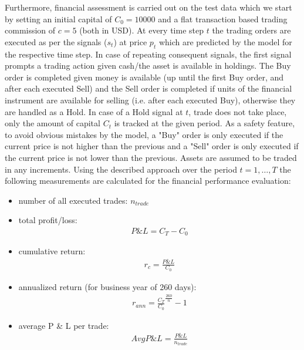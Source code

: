 \documentclass[12pt, a4paper]{article}
\begin{document}
Furthermore, financial assessment is carried out on the test data which we start by setting an initial capital of $C_0 = 10000$ and a flat transaction based trading commission of $c = 5$ (both in USD). At every time step $t$ the trading orders are executed as per the signals ($s_t$) at price $p_t$ which are predicted by the model for the respective time step.
In case of repeating consequent signals, the first signal prompts a trading action given cash/the asset is available in holdings. The Buy order is completed given money is available (up until the first Buy order, and after each executed Sell) and the Sell order is completed if units of the financial instrument are available for selling (i.e. after each executed Buy), otherwise they are handled as a Hold. In case of a Hold signal at $t$, trade does not take place, only the amount of capital $C_t$ is tracked at the given period. As a safety feature, to avoid obvious mistakes by the model, a "Buy" order is only executed if the current price is not higher than the previous and a "Sell" order is only executed if the current price is not lower than the previous.
Assets are assumed to be traded in any increments. Using the described approach over the period $t=1, \dots, T$ the following measurements are calculated for the financial performance evaluation:

\begin{itemize}
    \item number of all executed trades: $n_{trade}$
    \item total profit/loss: 
    \begin{align}
        \label{eq:totPL}
            P\& L = C_T - C_0
    \end{align}
    \item cumulative return: 
    \begin{align}
        \label{eq:cumret}
            r_c = \frac{P \& L}{C_0}
    \end{align}
    \item annualized return (for business year of 260 days): 
    \begin{align}
        \label{eq:annualized}
            r_{ann} = \frac{C_T}{C_0}^{\frac{260}{n}}-1
    \end{align}
    \item average P \& L per trade:
    \begin{align}
        \label{eq:avgpl}
        AvgP \& L = \frac{P \& L}{n_{trade}}
    \end{align}
\end{itemize}
\end{document}
